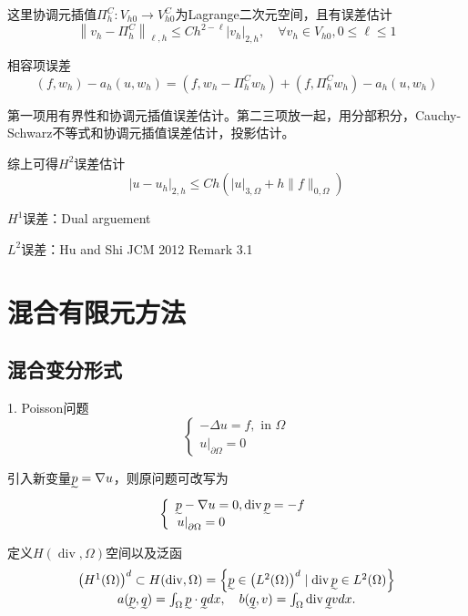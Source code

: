 这里协调元插值$\Pi_h^C: V_{h0} \to V_{h0}^C$为Lagrange二次元空间，且有误差估计
\[
  \left\|v_{h}-\Pi_{h}^{C}\right\|_{\ell, h} \le C h^{2-\ell}\left|v_{h}\right|_{2, h}, \quad \forall v_{h} \in V_{h 0}, 0 \le \ell \le 1
\]

相容项误差
\[
  \left(f, w_{h}\right)-a_{h}\left(u, w_{h}\right)=\left(f, w_{h}-\Pi_{h}^{C} w_{h}\right)+\left(f, \Pi_{h}^{C} w_{h}\right)-a_{h}\left(u, w_{h}\right)
\]

第一项用有界性和协调元插值误差估计。第二三项放一起，用分部积分，Cauchy-Schwarz不等式和协调元插值误差估计，投影估计。

综上可得$H^2$误差估计
\[
  \left|u-u_{h}\right|_{2, h} \le C h\left(|u|_{3, \Omega}+h\|f\|_{0, \Omega}\right)
\]

$H^1$误差：Dual arguement

$L^2$误差：Hu and Shi JCM 2012 Remark 3.1

\section{混合有限元方法}

\subsection{混合变分形式}

1. Poisson问题
\[
  \left\{\begin{array}{l}
    -\Delta u=f, \text{ in } \Omega\\
    \left.u\right|_{\partial \Omega}=0
  \end{array}\right.
\]

引入新变量$\undertilde{p}=\nabla u$，则原问题可改写为
\[
  \left\{\begin{array}{l}
    \undertilde{p}-\nabla u=0, \operatorname{div} \undertilde{p}=-f \\
    \left.u\right|_{\partial \Omega}=0
  \end{array}\right.
\]

定义$H(\operatorname{div}, \Omega)$空间以及泛函
\[
  \begin{array}{c}
    \left(H^{1}(\Omega)\right)^{d} \subset H(\operatorname{div}, \Omega)=\left\{\undertilde{p} \in \left(L^{2}(\Omega)\right)^{d} \mid \operatorname{div} \undertilde{p} \in L^{2}(\Omega)\right\} \\
    a(\undertilde{p}, \undertilde{q})=\int_{\Omega} \undertilde{p} \cdot \undertilde{q} dx, \quad b(\undertilde{q}, v)=\int_{\Omega} \operatorname{div} \undertilde{q} v dx .
  \end{array}
\]

